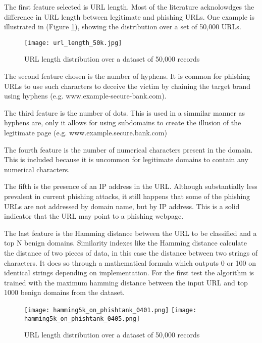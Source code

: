 The first feature selected is URL length. Most of the literature acknolowdges the difference in URL length between legitimate and phishing URLs. One example is illustrated in \cite{STACKED_ML_URL_HTML} (Figure \ref{fig:URL_LENGTH_DISTRIBUTION}), showing the distribution over a set of 50,000 URLs.

\begin{figure}[t]
	\centering
	\texttt{[image: url\_length\_50k.jpg]}
	\caption{URL length distribution over a dataset of 50,000 records}
	\label{fig:URL_LENGTH_DISTRIBUTION}
\end{figure}

The second feature chosen is the number of hyphens. It is common for phishing URLs to use such characters to deceive the victim by chaining the target brand using hyphens (e.g. www.example-secure-bank.com).

The third feature is the number of dots. This is used in a simmilar manner as hyphens are, only it allows for using subdomains to create the illusion of the legitimate page (e.g. www.example.secure.bank.com)

The fourth feature is the number of numerical characters present in the domain. This is included because it is uncommon for legitimate domains to contain any numerical characters.

The fifth is the presence of an IP address in the URL. Although substantially less prevalent in current phishing attacks, it still happens that some of the phishing URLs are not addressed by domain name, but by IP address. This is a solid indicator that the URL may point to a phishing webpage.

The last feature is the Hamming distance between the URL to be classified and a top N benign domains. Similarity indexes like the Hamming distance calculate the distance of two pieces of data, in this case the distance between two strings of characters. It does so through a mathematical formula which outputs 0 or 100 on identical strings depending on implementation. For the first test the algorithm is trained with the maximum hamming distance between the input URL and top 1000 benign domains from the \cite{MAJESTIC_MILLION} dataset.

\begin{figure}
	\centering
	\texttt{[image: hamming5k\_on\_phishtank\_0401.png]}
	\texttt{[image: hamming5k\_on\_phishtank\_0405.png]}
	\caption{URL length distribution over a dataset of 50,000 records}
	\label{fig:HAMMING_ON_PHISHTANK}
\end{figure}


